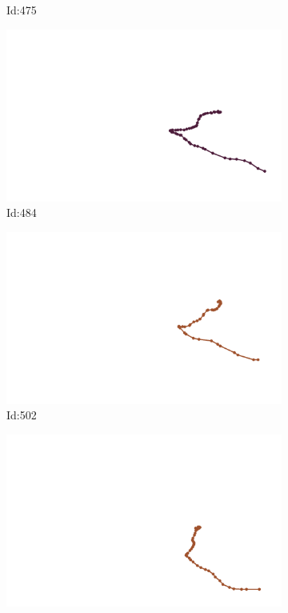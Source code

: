\documentclass[12pt,twoside]{report}
\begin{document}
\begin{figure}
\begin{subfigure}[b]{0.20\textwidth}
\caption{Id:475}
\end{subfigure}
\begin{subfigure}[b]{0.20\textwidth}
\centering
\includegraphics[width=\textwidth]{../trajectories/484.png}
\caption{Id:484}
\end{subfigure}
\begin{subfigure}[b]{0.20\textwidth}
\centering
\includegraphics[width=\textwidth]{../trajectories/502.png}
\caption{Id:502}
\end{subfigure}
\begin{subfigure}[b]{0.20\textwidth}
\centering
\includegraphics[width=\textwidth]{../trajectories/509.png}

\end{subfigure}
\end{figure}
\end{document}
